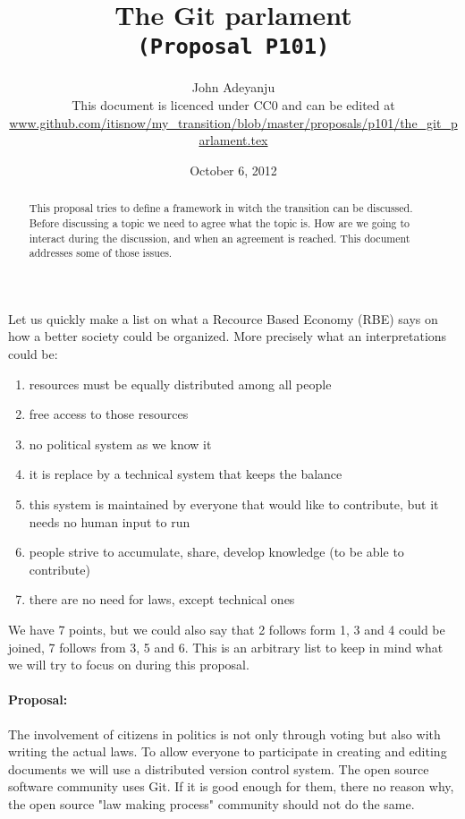 \documentclass{article}
\begin{document}
\title{The Git parlament\\\tt{\small{(Proposal P101)}}\\\tt{\small{}}}%
\author{John Adeyanju\\\small{This document is licenced under CC0 and can be edited at}\\ \scriptsize{\url{www.github.com/itisnow/my_transition/blob/master/proposals/p101/the_git_parlament.tex}}}
\date{October 6, 2012}

\maketitle

\begin{abstract}
This proposal tries to define a framework in witch the transition can be discussed.
Before discussing a topic we need to agree what the topic is.
How are we going to interact during the discussion, and when an agreement is reached.
This document addresses some of those issues.
\end{abstract}

Let us quickly make a list on what a Recource Based Economy (RBE)\cite{rbe} says on how a better society could be organized.
More precisely what an interpretations could be:
\begin{enumerate}
\item resources must be equally distributed among all people
\item free access to those resources
\item no political system as we know it
\item it is replace by a technical system that keeps the balance
\item this system is maintained by everyone that would like to contribute, but it needs no human input to run
\item people strive to accumulate, share, develop knowledge (to be able to contribute)
\item there are no need for laws, except technical ones
\end{enumerate}
We have 7 points, but we could also say that 2 follows form 1, 3 and 4 could be joined, 7 follows from 3, 5 and 6.
This is an arbitrary list to keep in mind what we will try to focus on during this proposal.

\paragraph{Proposal:}
The involvement of citizens in politics is not only through voting but also with writing the actual laws.
To allow everyone to participate in creating and editing documents we will use a distributed version control system.
The open source software community uses Git.
If it is good enough for them, there no reason why, the open source "law making process" community should not do the same.
\end{document}
